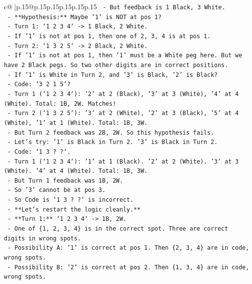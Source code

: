 \documentclass{article}
\begin{document}
{\begin{supertabular}{c@{$\;$}|p{.15\linewidth}@{}p{.15\linewidth}p{.15\linewidth}p{.15\linewidth}p{.15\linewidth}p{.15\linewidth}}
{{{\texttt{      {-} But feedback is 1 Black, 3 White.} \\
\texttt{      {-} **Hypothesis:** Maybe '1' is NOT at pos 1?} \\
\texttt{        {-} Turn 1: `1 2 3 4` {-}> 1 Black, 2 White.} \\
\texttt{        {-} If '1' is not at pos 1, then one of 2, 3, 4 is at pos 1.} \\
\texttt{        {-} Turn 2: `1 3 2 5` {-}> 2 Black, 2 White.} \\
\texttt{        {-} If '1' is not at pos 1, then '1' must be a White peg here. But we have 2 Black pegs. So two other digits are in correct positions.} \\
\texttt{        {-} If '1' is White in Turn 2, and '3' is Black, '2' is Black?} \\
\texttt{          {-} Code: `3 2 1 5`?} \\
\texttt{          {-} Turn 1 (`1 2 3 4`): '2' at 2 (Black), '3' at 3 (White), '4' at 4 (White). Total: 1B, 2W. Matches!} \\
\texttt{          {-} Turn 2 (`1 3 2 5`): '3' at 2 (White), '2' at 3 (Black), '5' at 4 (White), '1' at 1 (White). Total: 1B, 3W.} \\
\texttt{          {-} But Turn 2 feedback was 2B, 2W. So this hypothesis fails.} \\
\texttt{        {-} Let's try: '1' is Black in Turn 2. '3' is Black in Turn 2.} \\
\texttt{          {-} Code: `1 3 ? ?`.} \\
\texttt{          {-} Turn 1 (`1 2 3 4`): '1' at 1 (Black). '2' at 2 (White). '3' at 3 (White). '4' at 4 (White). Total: 1B, 3W.} \\
\texttt{          {-} But Turn 1 feedback was 1B, 2W.} \\
\texttt{          {-} So '3' cannot be at pos 3.} \\
\texttt{          {-} So Code is `1 3 ? ?` is incorrect.} \\
\texttt{      {-} **Let's restart the logic cleanly.**} \\
\texttt{      {-} **Turn 1:** `1 2 3 4` {-}> 1B, 2W.} \\
\texttt{        {-} One of \{1, 2, 3, 4\} is in the correct spot. Three are correct digits in wrong spots.} \\
\texttt{        {-} Possibility A: '1' is correct at pos 1. Then \{2, 3, 4\} are in code, wrong spots.} \\
\texttt{        {-} Possibility B: '2' is correct at pos 2. Then \{1, 3, 4\} are in code, wrong spots.} \\
}}}
\end{supertabular}}
\end{document}
